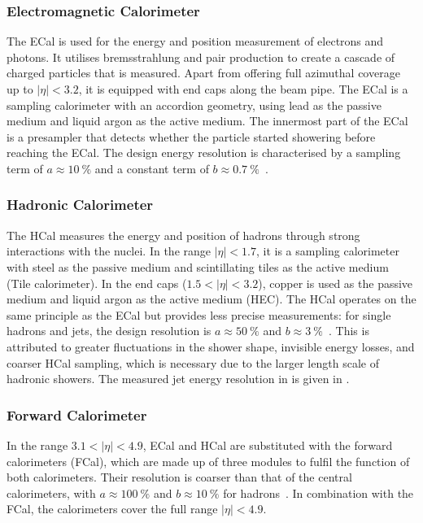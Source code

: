 \subsubsection{Electromagnetic Calorimeter}
The ECal is used for the energy and position measurement of electrons and photons. It utilises bremsstrahlung and pair production to create a cascade of charged particles that is measured. Apart from offering full azimuthal coverage up to $|\eta|<3.2$, it is equipped with end caps along the beam pipe. The \atlas ECal is a sampling calorimeter with an accordion geometry, using lead as the passive medium and liquid argon as the active medium. The innermost part of the ECal is a presampler that detects whether the particle started showering before reaching the ECal. The design energy resolution is characterised by a sampling term of $a\approx\qty{10}{\percent}$ and a constant term of $b\approx\qty{0.7}{\percent}$~\cite{atlas_lar_tdr,atlas_egamma_run2}.

\subsubsection{Hadronic Calorimeter}
The HCal measures the energy and position of hadrons through strong interactions with the nuclei. In the range $|\eta|<1.7$, it is a sampling calorimeter with steel as the passive medium and scintillating tiles as the active medium (Tile calorimeter). In the end caps ($1.5<|\eta|<3.2$), copper is used as the passive medium and liquid argon as the active medium (HEC). The HCal operates on the same principle as the ECal but provides less precise measurements: for single hadrons and jets, the design resolution is $a\approx\qty{50}{\percent}$ and $b\approx\qty{3}{\percent}$~\cite{atlas_tile_tdr,atlas_lar_tdr}. This is attributed to greater fluctuations in the shower shape, invisible energy losses, and coarser HCal sampling, which is necessary due to the larger length scale of hadronic showers. The measured jet energy resolution in \LHCrunii is given in \cite{atlas_jer_run2}.

\subsubsection{Forward Calorimeter}
In the range $3.1<|\eta|<4.9$, ECal and HCal are substituted with the forward calorimeters (FCal), which are made up of three modules to fulfil the function of both calorimeters. Their resolution is coarser than that of the central calorimeters, with $a\approx\qty{100}{\percent}$ and $b\approx\qty{10}{\percent}$ for hadrons~\cite{atlas_lar_tdr,atlas_jinst}. In combination with the FCal, the calorimeters cover the full range $|\eta|<4.9$.

